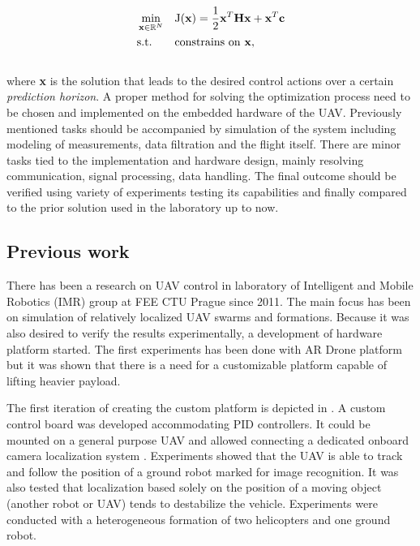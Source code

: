 \begin{equation}
\label{eq:qmpc_intro}
\begin{aligned}
& \min_{\textbf{x} \in \mathbb{R}^{N}}
& & \mathrm{J}(\textbf{x}) = \frac{1}{2}\textbf{x}^T\textbf{H}\textbf{x} + \textbf{x}^T\textbf{c}\\
& \text{s.t.}
& & \text{constrains on \textbf{x}},
\end{aligned}
\end{equation}
\\
where \textbf{x} is the solution that leads to the desired control actions over a certain \emph{prediction horizon}. A proper method for solving the optimization process need to be chosen and implemented on the embedded hardware of the UAV. Previously mentioned tasks should be accompanied by simulation of the system including modeling of measurements, data filtration and the flight itself. There are minor tasks tied to the implementation and hardware design, mainly resolving communication, signal processing, data handling. The final outcome should be verified using variety of experiments testing its capabilities and finally compared to the prior solution used in the laboratory up to now.

\subsection{Previous work}
\label{cap:prior_work}

There has been a research on UAV control in laboratory of Intelligent and Mobile Robotics (IMR) group at FEE CTU Prague since 2011. The main focus has been on simulation of relatively localized UAV swarms and formations. Because it was also desired to verify the results experimentally, a development of hardware platform started. The first experiments has been done with AR Drone platform \citep{kranik2012drone} but it was shown that there is a need for a customizable platform capable of lifting heavier payload.

The first iteration of creating the custom platform is depicted in \citep{baca2013}. A custom control board was developed accommodating PID controllers. It could be mounted on a general purpose UAV and allowed connecting a dedicated onboard camera localization system \citep{faigl2013low}. Experiments showed that the UAV is able to track and follow the position of a ground robot marked for image recognition. It was also tested that localization based solely on the position of a moving object (another robot or UAV) tends to destabilize the vehicle. Experiments were conducted with a heterogeneous formation of two helicopters and one ground robot.

